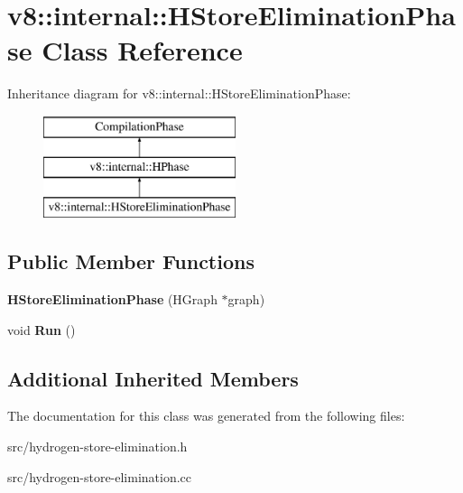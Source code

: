 \hypertarget{classv8_1_1internal_1_1_h_store_elimination_phase}{}\section{v8\+:\+:internal\+:\+:H\+Store\+Elimination\+Phase Class Reference}
\label{classv8_1_1internal_1_1_h_store_elimination_phase}
Inheritance diagram for v8\+:\+:internal\+:\+:H\+Store\+Elimination\+Phase\+:\begin{figure}[H]
\begin{center}
\leavevmode
\includegraphics[height=3.000000cm]{classv8_1_1internal_1_1_h_store_elimination_phase}
\end{center}
\end{figure}
\subsection*{Public Member Functions}
\begin{DoxyCompactItemize}
\item 
\hypertarget{classv8_1_1internal_1_1_h_store_elimination_phase_a4ebd679252c7a3a4f2af3c787a46d573}{}{\bfseries H\+Store\+Elimination\+Phase} (H\+Graph $\ast$graph)\label{classv8_1_1internal_1_1_h_store_elimination_phase_a4ebd679252c7a3a4f2af3c787a46d573}

\item 
\hypertarget{classv8_1_1internal_1_1_h_store_elimination_phase_ab6ed64dc56221ae3b84f15c082890529}{}void {\bfseries Run} ()\label{classv8_1_1internal_1_1_h_store_elimination_phase_ab6ed64dc56221ae3b84f15c082890529}

\end{DoxyCompactItemize}
\subsection*{Additional Inherited Members}


The documentation for this class was generated from the following files\+:\begin{DoxyCompactItemize}
\item 
src/hydrogen-\/store-\/elimination.\+h\item 
src/hydrogen-\/store-\/elimination.\+cc\end{DoxyCompactItemize}
